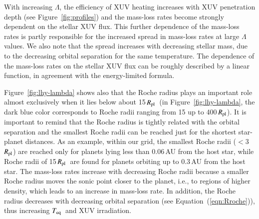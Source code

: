 \documentclass{aa}
\def\Teq{$T_{\rm eq}$}
\def\Rpl{$R_{\rm pl}$}
\begin{document}
With increasing $\Lambda$, the efficiency of XUV heating increases with XUV penetration depth (see Figure~\ref{fig:profiles}) and the mass-loss rates become strongly dependent on the stellar XUV flux. This further dependence of the mass-loss rates is partly responsible for the increased spread in mass-loss rates at large $\Lambda$ values. We also note that the spread increases with decreasing stellar mass, due to the decreasing orbital separation for the same temperature. The dependence of the mass-loss rates on the stellar XUV flux can be roughly described by a linear function, in agreement with the energy-limited formula.

Figure~\ref{fig:lhy-lambda} shows also that the Roche radius plays
an important role almost exclusively when it lies below about
15\,\Rpl\  (in Figure~\ref{fig:lhy-lambda}, the dark blue color
corresponds to Roche radii ranging from 15 up to 400\,\Rpl). It is
important to remind that the Roche radius is tightly related with
the orbital separation and the smallest Roche radii can be reached
just for the shortest star-planet distances. As an example, within
our grid, the smallest Roche radii ($<$3\,\Rpl) are reached only
for planets lying less than 0.06\,AU from the host star, while
Roche radii of 15\,\Rpl\ are found for planets orbiting up to
0.3\,AU from the host star. The mass-loss rates increase with
decreasing Roche radii {because a smaller Roche radius moves the
sonic point closer to the planet, i.e., to regions of higher
density, which leads to an increase in mass-loss rate.} In
addition, the Roche radius decreases with decreasing orbital
separation (see Equation~(\ref{eqn:Rroche})), thus increasing
\Teq\ and XUV irradiation.
\end{document}
